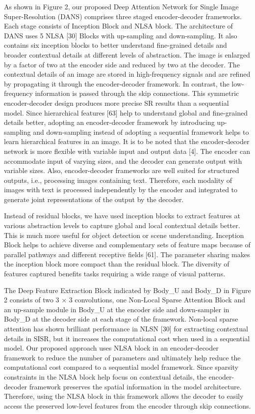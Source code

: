 \documentclass{ieeeaccess}
\begin{document}
As shown in Figure 2, our proposed Deep Attention Network for Single Image Super-Resolution (DANS) comprises three staged encoder-decoder frameworks. Each stage consists of Inception Block and NLSA block. The architecture of DANS uses 5 NLSA [30] Blocks with up-sampling and down-sampling. It also contains six inception blocks to better understand fine-grained details and broader contextual details at different levels of abstraction. The image is enlarged by a factor of two at the encoder side and reduced by two at the decoder. The contextual details of an image are stored in high-frequency signals and are refined by propagating it through the encoder-decoder framework. In contrast, the low-frequency information is passed through the skip connections. This symmetric encoder-decoder design produces more precise SR results than a sequential model. Since hierarchical features [63] help to understand global and fine-grained details better, adopting an encoder-decoder framework by introducing up-sampling and down-sampling instead of adopting a sequential framework helps to learn hierarchical features in an image. It is to be noted that the encoder-decoder network is more flexible with variable input and output data [4]. The encoder can accommodate input of varying sizes, and the decoder can generate output with variable sizes. Also, encoder-decoder frameworks are well suited for structured outputs, i.e., processing images containing text. Therefore, each modality of images with text is processed independently by the encoder and integrated to generate joint representations of the output by the decoder. 

Instead of residual blocks, we have used inception blocks to extract features at various abstraction levels to capture global and local contextual details better. This is much more useful for object detection or scene understanding. Inception Block helps to achieve diverse and complementary sets of feature maps because of parallel pathways and different receptive fields [61]. The parameter sharing makes the inception block more compact than the residual block. The diversity of features captured benefits tasks requiring a wide range of visual patterns. 

The Deep Feature Extraction Block indicated by Body\_U and Body\_D in Figure 2 consists of two 3 $\times$ 3 convolutions, one Non-Local Sparse Attention Block and an up-sample module in Body\_U at the encoder side and down-sampler in Body\_D at the decoder side at each stage of the framework. Non-local sparse attention has shown brilliant performance in NLSN [30] for extracting contextual details in SISR, but it increases the computational cost when used in a sequential model. Our proposed approach uses NLSA block in an encoder-decoder framework to reduce the number of parameters and ultimately help reduce the computational cost compared to a sequential model framework. Since sparsity constraints in the NLSA block help focus on contextual details, the encoder-decoder framework preserves the spatial information in the model architecture. Therefore, using the NLSA block in this framework allows the decoder to easily access the preserved low-level features from the encoder through skip connections. 
\end{document}
